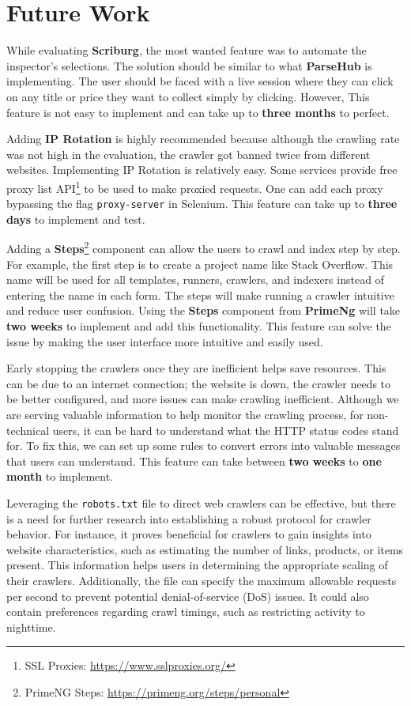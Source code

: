 \section{Future Work}
While evaluating \textbf{Scriburg}, the most wanted feature was to automate the inspector's selections. The solution should be similar to what \textbf{ParseHub} is implementing. The user should be faced with a live session where they can click on any title or price they want to collect simply by clicking. However, This feature is not easy to implement and can take up to \textbf{three months} to perfect. 

Adding \textbf{IP Rotation} is highly recommended because although the crawling rate was not high in the evaluation, the crawler got banned twice from different websites. Implementing IP Rotation is relatively easy. Some services provide free proxy list API\footnote{SSL Proxies: \url{https://www.sslproxies.org/}} to be used to make proxied requests. One can add each proxy bypassing the flag \texttt{proxy-server} in Selenium. This feature can take up to \textbf{three days} to implement and test.

Adding a \textbf{Steps}\footnote{PrimeNG Steps: \url{https://primeng.org/steps/personal}} component can allow the users to crawl and index step by step. For example, the first step is to create a project name like Stack Overflow. This name will be used for all templates, runners, crawlers, and indexers instead of entering the name in each form. The steps will make running a crawler intuitive and reduce user confusion. Using the \textbf{Steps} component from \textbf{PrimeNg} will take \textbf{two weeks} to implement and add this functionality. This feature can solve the issue by making the user interface more intuitive and easily used.

Early stopping the crawlers once they are inefficient helps save resources. This can be due to an internet connection; the website is down, the crawler needs to be better configured, and more issues can make crawling inefficient. Although we are serving valuable information to help monitor the crawling process, for non-technical users, it can be hard to understand what the HTTP status codes stand for. To fix this, we can set up some rules to convert errors into valuable messages that users can understand. This feature can take between \textbf{two weeks} to \textbf{one month} to implement.

Leveraging the \texttt{robots.txt} file to direct web crawlers can be effective, but there is a need for further research into establishing a robust protocol for crawler behavior. For instance, it proves beneficial for crawlers to gain insights into website characteristics, such as estimating the number of links, products, or items present. This information helps users in determining the appropriate scaling of their crawlers. Additionally, the file can specify the maximum allowable requests per second to prevent potential denial-of-service (DoS) issues. It could also contain preferences regarding crawl timings, such as restricting activity to nighttime.
